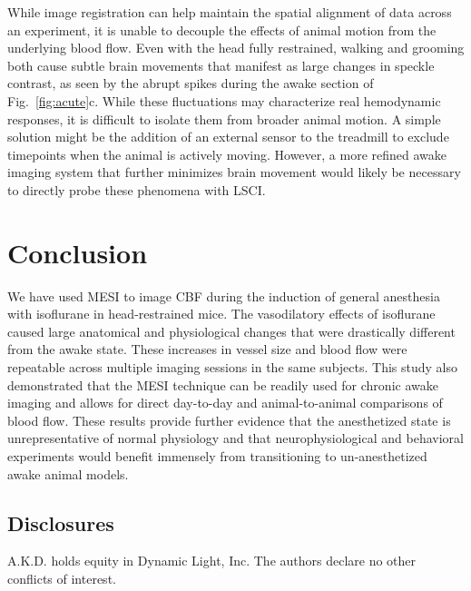 \documentclass[12pt]{spieman}
\begin{document}
\begin{spacing}{2}
While image registration can help maintain the spatial alignment of data across an experiment, it is unable to decouple the effects of animal motion from the underlying blood flow. Even with the head fully restrained, walking and grooming both cause subtle brain movements that manifest as large changes in speckle contrast, as seen by the abrupt spikes during the awake section of Fig.~\ref{fig:acute}c. While these fluctuations may characterize real hemodynamic responses, it is difficult to isolate them from broader animal motion. A simple solution might be the addition of an external sensor to the treadmill \cite{Dombeck:2007gr} to exclude timepoints when the animal is actively moving. However, a more refined awake imaging system that further minimizes brain movement would likely be necessary to directly probe these phenomena with LSCI.


\section{Conclusion}
\label{sect:conclusion}

We have used MESI to image CBF during the induction of general anesthesia with isoflurane in head-restrained mice. The vasodilatory effects of isoflurane caused large anatomical and physiological changes that were drastically different from the awake state. These increases in vessel size and blood flow were repeatable across multiple imaging sessions in the same subjects. This study also demonstrated that the MESI technique can be readily used for chronic awake imaging and allows for direct day-to-day and animal-to-animal comparisons of blood flow. These results provide further evidence that the anesthetized state is unrepresentative of normal physiology and that neurophysiological and behavioral experiments would benefit immensely from transitioning to un-anesthetized awake animal models.


\subsection*{Disclosures}
A.K.D. holds equity in Dynamic Light, Inc. The authors declare no other conflicts of interest.


\end{spacing}
\end{document}
